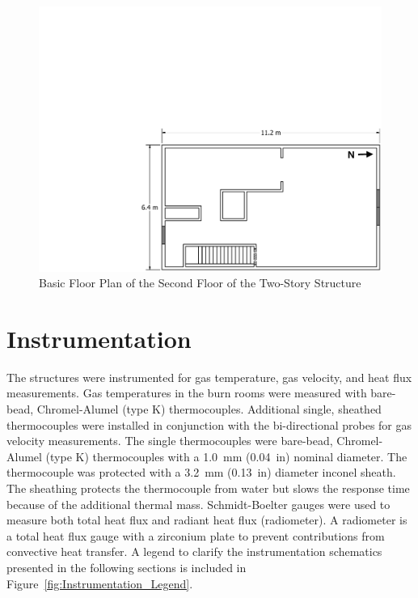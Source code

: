 \documentclass[12pt,oneside]{book}
\begin{document}
\begin{figure}[!ht]
	\includegraphics[width=\columnwidth]{../../DelCo_2014_2015/Drawings/PDFs/CAFS/West_Structure_2nd_Floor_Plain}
	\caption{Basic Floor Plan of the Second Floor of the Two-Story Structure}
	\label{fig:dimensioned_second_2story}
\end{figure}

\clearpage

\section{Instrumentation}
\label{sec:Instrumentation}

The structures were instrumented for gas temperature, gas velocity, and heat flux measurements. Gas temperatures in the burn rooms were measured with bare-bead, Chromel-Alumel (type K) thermocouples. Additional single, sheathed thermocouples were installed in conjunction with the bi-directional probes for gas velocity measurements. The single thermocouples were bare-bead, Chromel-Alumel (type K) thermocouples with a 1.0~mm (0.04~in) nominal diameter. The thermocouple was protected with a 3.2~mm (0.13~in) diameter inconel sheath. The sheathing protects the thermocouple from water but slows the response time because of the additional thermal mass. Schmidt-Boelter gauges were used to measure both total heat flux and radiant heat flux (radiometer). A radiometer is a total heat flux gauge with a zirconium plate to prevent contributions from convective heat transfer. A legend to clarify the instrumentation schematics presented in the following sections is included in Figure~\ref{fig:Instrumentation_Legend}.
\end{document}
